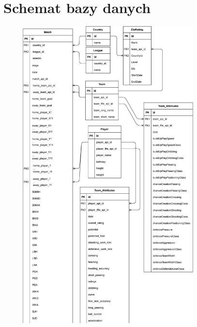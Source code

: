\section{Schemat bazy danych}
\label{database_schema}
\begin{figure}[h]
  \centering
   \includegraphics[width=0.83\textwidth]{figures/match_predict_schema_1.png}%
  \label{fig:match_predict_schema}
\end{figure}
\newpage
